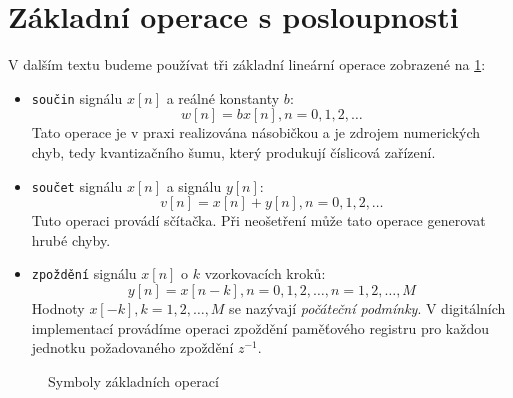   \section{Základní operace s posloupnosti}
    V dalším textu budeme používat tři základní lineární operace zobrazené na \ref{ces:fig048}:
    \begin{itemize}
      \item \texttt{součin} signálu $x[n]$ a reálné konstanty $b$:
            $$w[n]=bx[n], n = 0,1,2, \ldots$$ Tato operace je v praxi realizována násobičkou a je
            zdrojem numerických chyb, tedy kvantizačního šumu, který produkují číslicová zařízení.
      \item \texttt{součet} signálu $x[n]$ a signálu $y[n]$:
            $$v[n]=x[n]+y[n], n = 0,1,2, \ldots$$ Tuto operaci provádí sčítačka. Při neošetření může
            tato operace generovat hrubé chyby.
      \item \texttt{zpoždění} signálu $x[n]$ o $k$ vzorkovacích kroků:  
            $$y[n]=x[n-k], n = 0,1,2, \ldots, n = 1,2, \ldots, M $$  Hodnoty $x[-k], k = 1, 2,
            \ldots, M$ se nazývají \emph{počáteční podmínky}. V digitálních implementací provádíme
            operaci zpoždění paměťového registru pro každou jednotku požadovaného zpoždění $z^{-1}$.
    \end{itemize}

    \begin{figure}[ht!]
      \centering
        \newline
      \caption[Základní operace]{Symboly základních operací \cite[s.~7]{Sovka2002}} 
      \label{ces:fig048}
    \end{figure}